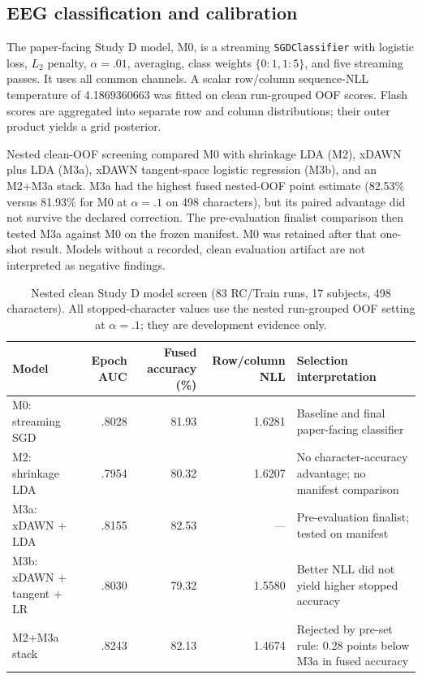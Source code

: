 \documentclass[final,5p,times,twocolumn,authoryear]{elsarticle}
\begin{document}
\subsection{EEG classification and calibration}
The paper-facing Study D model, M0, is a streaming \texttt{SGDClassifier} with logistic loss, $L_2$ penalty, $\alpha=.01$, averaging, class weights $\{0:1,1:5\}$, and five streaming passes. It uses all common channels. A scalar row/column sequence-NLL temperature of 4.1869360663 was fitted on clean run-grouped OOF scores. Flash scores are aggregated into separate row and column distributions; their outer product yields a grid posterior.

Nested clean-OOF screening compared M0 with shrinkage LDA (M2), xDAWN plus LDA (M3a), xDAWN tangent-space logistic regression (M3b), and an M2+M3a stack. M3a had the highest fused nested-OOF point estimate (82.53\% versus 81.93\% for M0 at $\alpha=.1$ on 498 characters), but its paired advantage did not survive the declared correction. The pre-evaluation finalist comparison then tested M3a against M0 on the frozen manifest. M0 was retained after that one-shot result. Models without a recorded, clean evaluation artifact are not interpreted as negative findings.

\begin{table}[t]
\centering\small
\caption{Nested clean Study D model screen (83 RC/Train runs, 17 subjects, 498 characters). All stopped-character values use the nested run-grouped OOF setting at $\alpha=.1$; they are development evidence only.}\label{tab:model-screen}
\begin{tabular}{lrrrl}
\toprule
Model & Epoch AUC & Fused accuracy (\%) & Row/column NLL & Selection interpretation\\
\midrule
M0: streaming SGD & .8028 & 81.93 & 1.6281 & Baseline and final paper-facing classifier\\
M2: shrinkage LDA & .7954 & 80.32 & 1.6207 & No character-accuracy advantage; no manifest comparison\\
M3a: xDAWN + LDA & .8155 & 82.53 & --- & Pre-evaluation finalist; tested on manifest\\
M3b: xDAWN + tangent + LR & .8030 & 79.32 & 1.5580 & Better NLL did not yield higher stopped accuracy\\
M2+M3a stack & .8243 & 82.13 & 1.4674 & Rejected by pre-set rule: 0.28 points below M3a in fused accuracy\\
\bottomrule
\end{tabular}
\end{table}
\end{document}
